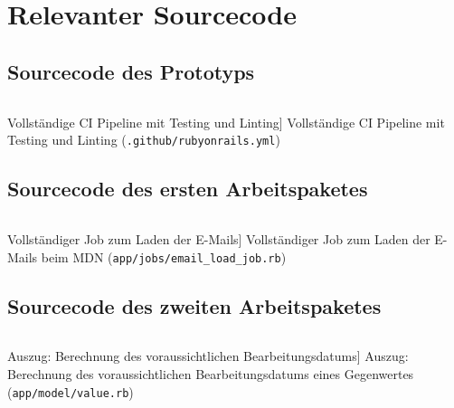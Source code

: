 
\chapter{Relevanter Sourcecode}
\label{Relevanter_Sourcecode}

\section{Sourcecode des Prototyps}
\label{Sourcecode_des_Prototyps}

\begin{listing}[H]
\inputminted[linenos]{yaml}{Listings/Prototype/rubyonrails.yml}

\caption
    [Vollständige CI Pipeline mit Testing und Linting]
    {Vollständige CI Pipeline mit Testing und Linting (\texttt{.github/rubyonrails.yml})}
\label{lst:pipeline}
\end{listing}

\section{Sourcecode des ersten Arbeitspaketes}

\begin{listing}[H]
\inputminted[linenos]{ruby}{Listings/Pkg1/email_load_job.rb}

\caption
    [Vollständiger Job zum Laden der E-Mails]
    {Vollständiger Job zum Laden der E-Mails beim MDN (\texttt{app/jobs/email\_load\_job.rb})}

\label{lst:job_full}
\end{listing}

\section{Sourcecode des zweiten Arbeitspaketes}

\begin{listing}[!ht]
\inputminted[firstline=8, lastline=18, linenos]{ruby}{Listings/Pkg2/value.rb}

\caption
    [Auszug: Berechnung des voraussichtlichen Bearbeitungsdatums]
    {Auszug: Berechnung des voraussichtlichen Bearbeitungsdatums eines Gegenwertes (\texttt{app/model/value.rb})}

\label{lst:value}
\end{listing}